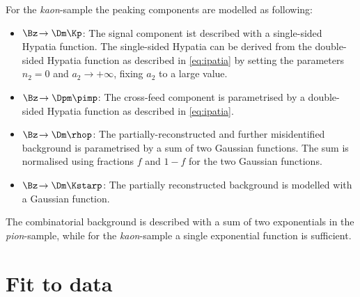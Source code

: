 For the \emph{kaon}-sample the peaking components are modelled as following:
\begin{itemize}
	\item $\Bz\!\to\Dm\Kp$: The signal component ist described with a single-sided Hypatia function. The single-sided Hypatia can be derived from the double-sided Hypatia function as described in \cref{eq:ipatia} by setting the parameters $n_2=0$ and $a_2\to+\infty$, \ie fixing $a_2$ to a large value.
	\item $\Bz\!\to\Dpm\pimp$: The cross-feed component is parametrised by a double-sided Hypatia function as described in \cref{eq:ipatia}.
	\item $\Bz\!\to\Dm\rhop$: The partially-reconstructed and further misidentified background is parametrised by a sum of two Gaussian functions. The sum is normalised using fractions $f$ and $1-f$ for the two Gaussian functions.
	\item $\Bz\!\to\Dm\Kstarp$: The partially reconstructed background is modelled with a Gaussian function.
\end{itemize}
The combinatorial background is described with a sum of two exponentials in the \emph{pion}-sample, while for the \emph{kaon}-sample a single exponential function is sufficient.

\section{Fit to data}
\label{sec:MassFitData}

